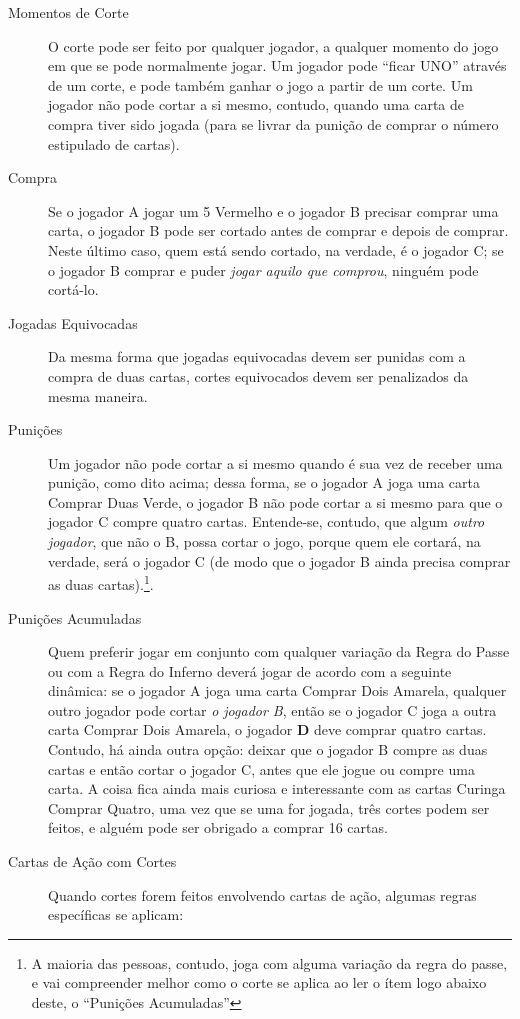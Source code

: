 \begin{description}
\item[Momentos de Corte]{O corte pode ser feito por qualquer jogador, a qualquer momento do jogo em que se pode normalmente jogar. Um jogador pode ``ficar UNO'' através de um corte, e pode também ganhar o jogo a partir de um corte. Um jogador não pode cortar a si mesmo, contudo, quando uma carta de compra tiver sido jogada (para se livrar da punição de comprar o número estipulado de cartas).}
\item[Compra]{Se o jogador A jogar um 5 Vermelho e o jogador B precisar comprar uma carta, o jogador B pode ser cortado antes de comprar e depois de comprar. Neste último caso, quem está sendo cortado, na verdade, é o jogador C; se o jogador B comprar e puder \emph{jogar aquilo que comprou}, ninguém pode cortá-lo.}
\item[Jogadas Equivocadas]{Da mesma forma que jogadas equivocadas devem ser punidas com a compra de duas cartas, cortes equivocados devem ser penalizados da mesma maneira.}
\item[Punições]{Um jogador não pode cortar a si mesmo quando é sua vez de receber uma punição, como dito acima; dessa forma, se o jogador A joga uma carta Comprar Duas Verde, o jogador B não pode cortar a si mesmo para que o jogador C compre quatro cartas. Entende-se, contudo, que algum \emph{outro jogador}, que não o B, possa cortar o jogo, porque quem ele cortará, na verdade, será o jogador C (de modo que o jogador B ainda precisa comprar as duas cartas).\footnote{A maioria das pessoas, contudo, joga com alguma variação da regra do passe, e vai compreender melhor como o corte se aplica ao ler o ítem logo abaixo deste, o ``Punições Acumuladas''}.}
\item[Punições Acumuladas]{Quem preferir jogar em conjunto com qualquer variação da Regra do Passe ou com a Regra do Inferno deverá jogar de acordo com a seguinte dinâmica: se o jogador A joga uma carta Comprar Dois Amarela, qualquer outro jogador pode cortar \emph{o jogador B}, então se o jogador C joga a outra carta Comprar Dois Amarela, o jogador \textbf{D} deve comprar quatro cartas. Contudo, há ainda outra opção: deixar que o jogador B compre as duas cartas e então cortar o jogador C, antes que ele jogue ou compre uma carta. A coisa fica ainda mais curiosa e interessante com as cartas Curinga Comprar Quatro, uma vez que se uma for jogada, três cortes podem ser feitos, e alguém pode ser obrigado a comprar 16 cartas.}
\item[Cartas de Ação com Cortes]{Quando cortes forem feitos envolvendo cartas de ação, algumas regras específicas se aplicam:
}
\end{description}
